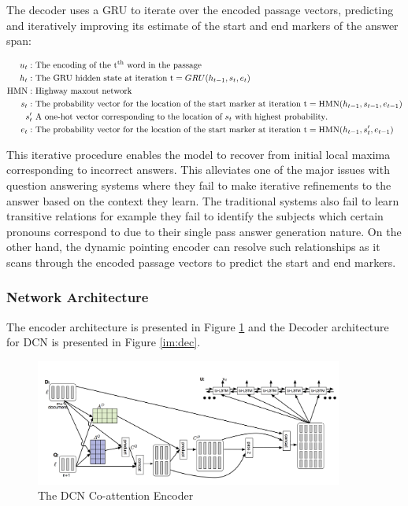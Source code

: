 The decoder uses a GRU to iterate over the encoded passage vectors, predicting and iteratively improving its estimate of the start and end markers of the answer span:

\begin{align*}
u_t: &\text{ The encoding of the t\textsuperscript{th} word in the passage} \\
h_t: &\text{ The GRU hidden state at iteration t} = GRU(h_{t - 1}, s_t, e_t) \\
\text{HMN}: &\text{ Highway maxout network} \\
s_t: &\text{ The probability vector for the location of the start marker at iteration t} = \text{HMN}(h_{t - 1}, s_{t - 1}, e_{t - 1}) \\
s_t' &\text{ A one-hot vector corresponding to the location of } s_t \text{ with highest probability}. \\
e_t: &\text{ The probability vector for the location of the start marker at iteration t} = \text{HMN}(h_{t - 1}, s_t', e_{t - 1})\\
\end{align*}

This iterative procedure enables the model to recover from initial local maxima corresponding to incorrect answers. This alleviates one of the major issues with question answering systems where they fail to make iterative refinements to the answer based on the context they learn. The traditional systems also fail to learn transitive relations for example they fail to identify the subjects which certain pronouns correspond to due to their single pass answer generation nature. On the other hand, the dynamic pointing encoder can resolve such relationships as it scans through the encoded passage vectors to predict the start and end markers.\\

\subsubsection{Network Architecture}
The encoder architecture is presented in Figure \ref{im:enc} and the Decoder architecture for DCN is presented in Figure \ref{im:dec}.

\begin{figure}[h]
    \centering
    \includegraphics[width=0.9\textwidth]{images/coattn_encoder.png}
    \caption{The DCN Co-attention Encoder \cite{DCN}}
    \label{im:enc}
\end{figure}

